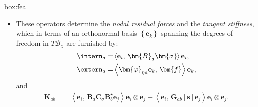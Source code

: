 \begin{ambox}{box:fea}
{\begin{itemize}
\item 
  These operators determine the \emph{nodal residual forces} and the \emph{tangent stiffness}, which  in terms of an orthonormal basis \(\left\{\mathbf{e}_k\right\}\) spanning the degrees of freedom in \(T\mathcal{B}_{\chi}\) are furnished by:
  \begin{equation}
    \begin{aligned}
    \intern_a =& \left<\mathbf{e}_i ,\, \bm{B}_a\bm{\sigma}\right>\mathbf{e}_i, \\
    \extern_a =& \left<\bm{\varphi}_{\eta a} \mathbf{e}_k,\, \bm{f}\right>\mathbf{e}_k,
    \end{aligned}
    \label{eq:def-pa}
  \end{equation}
  and
  \begin{equation*}
    \begin{aligned}
    \mathbf{K}_{ab} 
     =& \left<\mathbf{e}_i ,\,\bm{B}^{}_a \bm{C}_{\sigma}\bm{B}^{\star}_b \mathbf{e}_j\right> \mathbf{e}_i\otimes\mathbf{e}_j
      +\left<\mathbf{e}_i ,\, \bm{G}_{ab}[\bm{s}]\mathbf{e}_j\right> \mathbf{e}_i\otimes\mathbf{e}_j. 
    \end{aligned}
  \end{equation*}
\end{itemize}
}
\end{ambox} 

